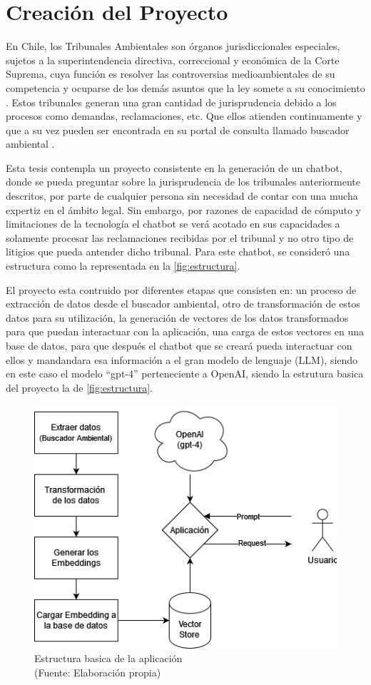 

\chapter{Creación del Proyecto}


En Chile, los Tribunales Ambientales son órganos jurisdiccionales especiales, sujetos a la 
superintendencia directiva, correccional y económica de la Corte Suprema, cuya función 
es resolver las controversias medioambientales de su competencia y ocuparse de los 
demás asuntos que la ley somete a su conocimiento \cite{Ley20600}. Estos tribunales generan una gran cantidad 
de jurisprudencia debido a los procesos como demandas, reclamaciones, etc. Que ellos atienden continuamente 
y que a su vez pueden ser encontrada en su portal de consulta llamado buscador ambiental \cite{BuscadorAmbiental}. 

Esta tesis contempla un proyecto consistente en la generación de un chatbot, donde se pueda preguntar sobre 
la jurisprudencia de los tribunales anteriormente descritos, por parte de cualquier persona sin necesidad de 
contar con una mucha expertiz en el ámbito legal. Sin embargo, por razones de capacidad de cómputo y limitaciones 
de la tecnología el chatbot se 
verá acotado en sus capacidades a solamente procesar las reclamaciones recibidas por el tribunal y no otro tipo de 
litigios que pueda antender dicho tribunal. Para este chatbot, se consideró una estructura como 
la representada en la \autoref{fig:estructura}.

El proyecto esta contruido por diferentes etapas que consisten en: un proceso de extracción de datos 
desde el buscador ambiental, otro de transformación de estos datos para su utilización, la generación 
de vectores de los datos transformados para que puedan interactuar con la aplicación, una carga de estos vectores 
en una base de datos,  para que después el chatbot que se creará pueda interactuar con ellos y mandandara 
esa información a el gran modelo de lenguaje (LLM), siendo en este caso el modelo ``gpt-4'' perteneciente a OpenAI,
 siendo la estrutura basica del proyecto la de \autoref{fig:estructura}.
\begin{figure}[ht!]
    \centering
    \includegraphics[width=.47\textwidth]{figures/huemul1.png}
    \caption[Estructura basica de la aplicación]{Estructura basica de la aplicación\\
    {\scriptsize (Fuente: Elaboración propia)}}
    \label{fig:estructura}
\end{figure}
    

